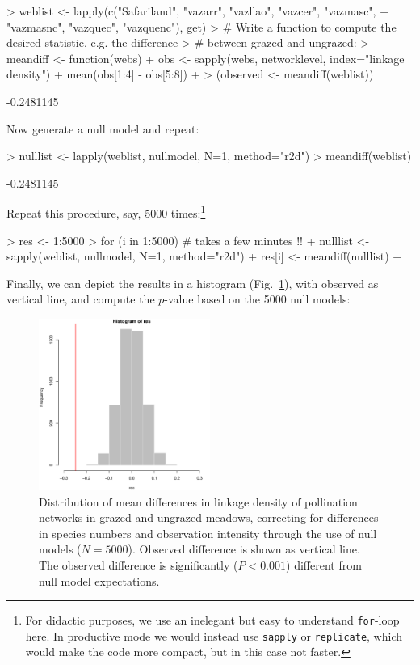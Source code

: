 \documentclass[a4paper, 11pt]{article}
\begin{document}
\begin{Schunk}
\begin{Sinput}
> weblist <- lapply(c("Safariland", "vazarr", "vazllao", "vazcer", "vazmasc", 
+                        "vazmasnc", "vazquec", "vazquenc"), get)
> # Write a function to compute the desired statistic, e.g. the difference 
> # between grazed and ungrazed:
> meandiff <- function(webs){
+    obs <- sapply(webs, networklevel, index="linkage density")  
+    mean(obs[1:4] - obs[5:8])
+ }
> (observed <- meandiff(weblist))
\end{Sinput}
\begin{Soutput}
[1] -0.2481145
\end{Soutput}
\end{Schunk}
Now generate a null model and repeat:
\begin{Schunk}
\begin{Sinput}
> nulllist <- lapply(weblist, nullmodel, N=1, method="r2d")
> meandiff(weblist)
\end{Sinput}
\begin{Soutput}
[1] -0.2481145
\end{Soutput}
\end{Schunk}
Repeat this procedure, say, 5000 times:\footnote{For didactic purposes, we use an inelegant but easy to understand \texttt{for}-loop here. In productive mode we would instead use \texttt{sapply} or \texttt{replicate}, which would make the code more compact, but in this case not faster.}
\begin{Schunk}
\begin{Sinput}
> res <- 1:5000
> for (i in 1:5000){ # takes a few minutes !!
+    nulllist <- sapply(weblist, nullmodel, N=1, method="r2d")
+    res[i] <- meandiff(nulllist)  
+ }
\end{Sinput}
\end{Schunk}
Finally, we can depict the results in a histogram (Fig.~\ref{fig:cattlenull}), with observed as vertical line, and compute the $p$-value based on the 5000 null models:
%
\begin{figure}
\centering
\includegraphics[width=0.5\textwidth]{figures/cattle_nullmodelled}
\caption{Distribution of mean differences in linkage density of pollination networks in grazed and ungrazed meadows, correcting for differences in species numbers and observation intensity through the use of null models ($N=5000$). Observed difference is shown as vertical line. The observed difference is significantly ($P<0.001$) different from null model expectations.}
\label{fig:cattlenull}
\end{figure}
\end{document}

